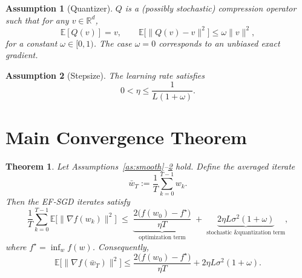 \documentclass{article}
\newtheorem{theorem}{Theorem}
\newtheorem{assumption}{Assumption}
\newcommand{\EE}{\mathbb{E}}
\newcommand{\R}{\mathbb{R}}
\begin{document}
\begin{assumption}[Quantizer]\label{as:quant}
$Q$ is a (possibly stochastic) compression operator such that for any $v\in\R^{d}$,
\[
\EE[Q(v)]=v,\qquad
\EE\!\big[\|Q(v)-v\|^{2}\big]\le\omega\|v\|^{2},
\]
for a constant $\omega\in[0,1)$.  The case $\omega=0$ corresponds to an unbiased exact gradient.
\end{assumption}

\begin{assumption}[Stepsize]\label{as:stepsize}
The learning rate satisfies
\[
0<\eta\le\frac{1}{L(1+\omega)}.
\]
\end{assumption}

\section*{Main Convergence Theorem}
\begin{theorem}\label{thm:main}
Let Assumptions~\ref{as:smooth}--\ref{as:stepsize} hold.  Define the averaged iterate
\[
\bar w_T:=\frac{1}{T}\sum_{k=0}^{T-1}w_k .
\]
Then the EF‑SGD iterates satisfy
\[
\frac{1}{T}\sum_{k=0}^{T-1}\EE\!\big[\|\nabla f(w_k)\|^{2}\big]
\;\le\;
\underbrace{\frac{2\big(f(w_0)-f^{\star}\big)}{\eta T}}_{\text{optimization term}}
\;+\;
\underbrace{2\eta L\sigma^{2}(1+\omega)}_{\text{stochastic \& quantization term}},
\tag{5}
\]
where $f^{\star}=\inf_{w}f(w)$.  Consequently,
\[
\EE\!\big[\|\nabla f(\bar w_T)\|^{2}\big]\le
\frac{2\big(f(w_0)-f^{\star}\big)}{\eta T}+2\eta L\sigma^{2}(1+\omega).
\]
\end{theorem}
\end{document}
